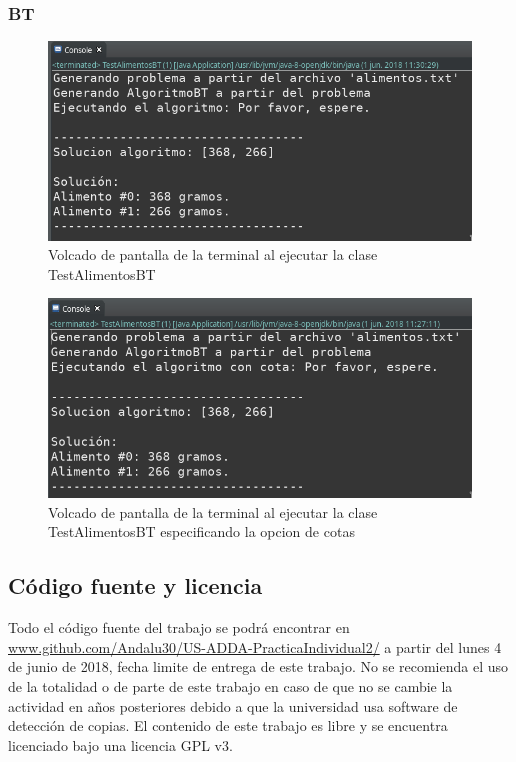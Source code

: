 \documentclass[a4paper,12pt]{article}
\begin{document}
\subsubsection{BT}
\begin{figure}[H]
  \centering
  \includegraphics[scale=0.5]{btSinfiltro.png}
  \caption{Volcado de pantalla de la terminal al ejecutar la clase TestAlimentosBT}
  \label{fig:btsincota}
\end{figure}
\begin{figure}[H]
  \centering
  \includegraphics[scale=0.5]{btCota.png}
  \caption{Volcado de pantalla de la terminal al ejecutar la clase TestAlimentosBT especificando la opcion de cotas}
  \label{fig:btconcota}
\end{figure}

\subsection{Código fuente y licencia}
Todo el código fuente del trabajo se podrá encontrar en \url{www.github.com/Andalu30/US-ADDA-PracticaIndividual2/}
a partir del lunes 4 de junio de 2018, fecha limite de entrega de este trabajo.
No se recomienda el uso de la totalidad o de parte de este trabajo en caso de que no se cambie la actividad en años posteriores debido a que la universidad usa software de detección de copias.
El contenido de este trabajo es libre y se encuentra licenciado bajo una licencia GPL v3.\\
\end{document}
